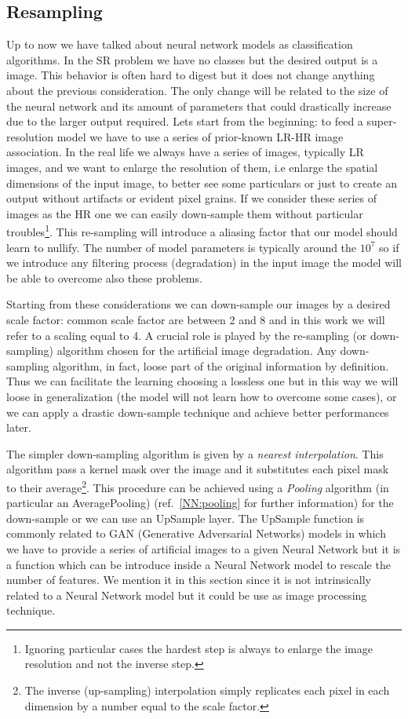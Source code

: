 \documentclass{standalone}
\begin{document}
\subsection[Resampling]{Resampling}\label{SR:downsampling}

Up to now we have talked about neural network models as classification algorithms.
In the SR problem we have no classes but the desired output is a image.
This behavior is often hard to digest but it does not change anything about the previous consideration.
The only change will be related to the size of the neural network and its amount of parameters that could drastically increase due to the larger output required.
Lets start from the beginning: to feed a super-resolution model we have to use a series of prior-known LR-HR image association.
In the real life we always have a series of images, typically LR images, and we want to enlarge the resolution of them, i.e enlarge the spatial dimensions of the input image, to better see some particulars or just to create an output without artifacts or evident pixel grains.
If we consider these series of images as the HR one we can easily down-sample them without particular troubles\footnote{
  Ignoring particular cases the hardest step is always to enlarge the image resolution and not the inverse step.
}.
This re-sampling will introduce a aliasing factor that our model should learn to nullify.
The number of model parameters is typically around the $10^7$ so if we introduce any filtering process (degradation) in the input image the model will be able to overcome also these problems.

Starting from these considerations we can down-sample our images by a desired scale factor: common scale factor are between 2 and 8 and in this work we will refer to a scaling equal to 4.
A crucial role is played by the re-sampling (or down-sampling) algorithm chosen for the artificial image degradation.
Any down-sampling algorithm, in fact, loose part of the original information by definition.
Thus we can facilitate the learning choosing a lossless one but in this way we will loose in generalization (the model will not learn how to overcome some cases), or we can apply a drastic down-sample technique and achieve better performances later.

The simpler down-sampling algorithm is given by a \emph{nearest interpolation}.
This algorithm pass a kernel mask over the image and it substitutes each pixel mask to their average\footnote{
  The inverse (up-sampling) interpolation simply replicates each pixel in each dimension by a number equal to the scale factor.
}.
This procedure can be achieved using a \emph{Pooling} algorithm (in particular an AveragePooling) (ref.~\ref{NN:pooling} for further information) for the down-sample or we can use an UpSample layer.
The UpSample function is commonly related to GAN (Generative Adversarial Networks) models in which we have to provide a series of artificial images to a given Neural Network but it is a function which can be introduce inside a Neural Network model to rescale the number of features.
We mention it in this section since it is not intrinsically related to a Neural Network model but it could be use as image processing technique.
\end{document}
